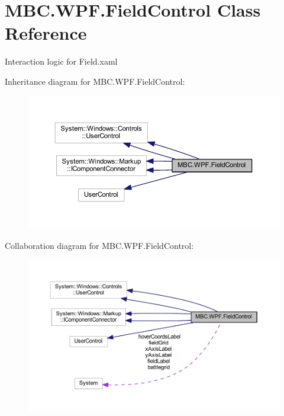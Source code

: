 \hypertarget{class_m_b_c_1_1_w_p_f_1_1_field_control}{\section{M\-B\-C.\-W\-P\-F.\-Field\-Control Class Reference}
\label{class_m_b_c_1_1_w_p_f_1_1_field_control}
}


Interaction logic for Field.\-xaml  




Inheritance diagram for M\-B\-C.\-W\-P\-F.\-Field\-Control\-:\nopagebreak
\begin{figure}[H]
\begin{center}
\leavevmode
\includegraphics[width=350pt]{class_m_b_c_1_1_w_p_f_1_1_field_control__inherit__graph}
\end{center}
\end{figure}


Collaboration diagram for M\-B\-C.\-W\-P\-F.\-Field\-Control\-:\nopagebreak
\begin{figure}[H]
\begin{center}
\leavevmode
\includegraphics[width=350pt]{class_m_b_c_1_1_w_p_f_1_1_field_control__coll__graph}
\end{center}
\end{figure}
